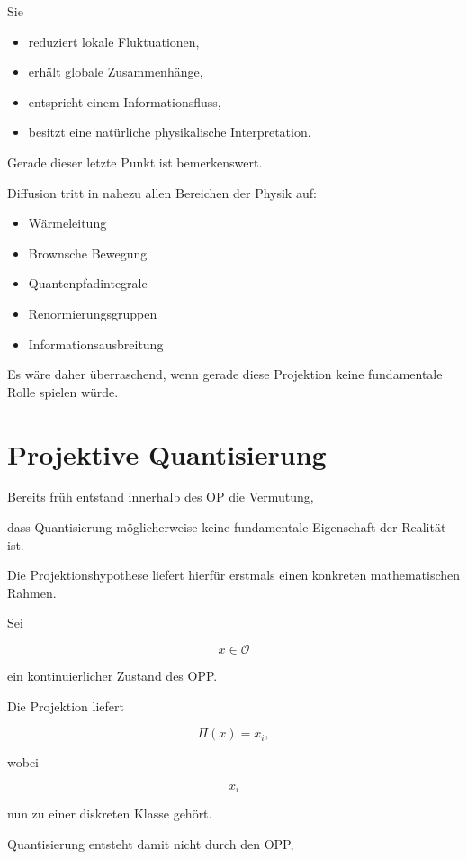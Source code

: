 Sie

\begin{itemize}
\item reduziert lokale Fluktuationen,

\item erhält globale Zusammenhänge,

\item entspricht einem Informationsfluss,

\item besitzt eine natürliche physikalische Interpretation.
\end{itemize}

Gerade dieser letzte Punkt ist bemerkenswert.

Diffusion tritt in nahezu allen Bereichen der Physik auf:

\begin{itemize}
\item Wärmeleitung
\item Brownsche Bewegung
\item Quantenpfadintegrale
\item Renormierungsgruppen
\item Informationsausbreitung
\end{itemize}

Es wäre daher überraschend, wenn gerade diese Projektion keine fundamentale Rolle spielen würde.

\section*{Projektive Quantisierung}

Bereits früh entstand innerhalb des OP die Vermutung,

dass Quantisierung möglicherweise keine fundamentale Eigenschaft der Realität ist.

Die Projektionshypothese liefert hierfür erstmals einen konkreten mathematischen Rahmen.

Sei

\[
x
\in
\mathcal O
\]

ein kontinuierlicher Zustand des OPP.

Die Projektion liefert

\[
\Pi(x)
=
x_i,
\]

wobei

\[
x_i
\]

nun zu einer diskreten Klasse gehört.

Quantisierung entsteht damit nicht durch den OPP,

